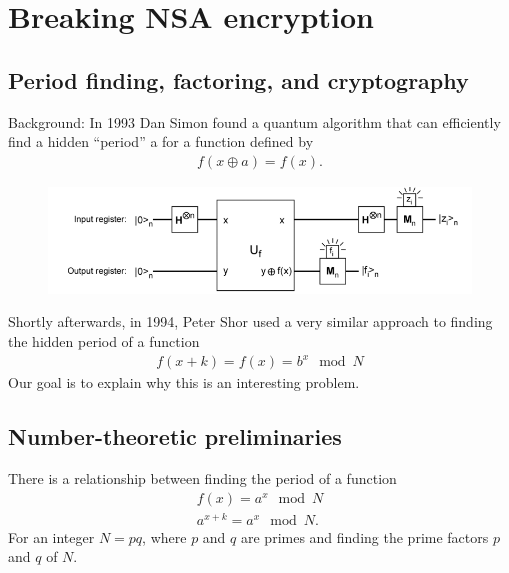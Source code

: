 \documentclass{book}
\theoremstyle{definition}
\begin{document}
\newpage


\section{Breaking NSA encryption}

\subsection{Period finding, factoring, and cryptography}
Background: In 1993 Dan Simon found a quantum
algorithm that can efficiently find a hidden ``period'' a for a
function defined by
\begin{align}
f(x \oplus a) = f(x).
\end{align}
\begin{figure}[!htb]
	\centering
	\includegraphics[scale=0.5]{rsa1}
\end{figure}


Shortly afterwards, in 1994, Peter Shor used a very similar
approach to finding the hidden period of a function 
\begin{align}
f(x+k) = f(x)= b^x \mod N
\end{align}
Our goal is to explain why this is an interesting problem. 
























\subsection{Number-theoretic preliminaries}


There is a relationship between finding the period of a function
\begin{align}
f(x) = a^x \mod N\\
a^{x+k} = a^x \mod N.
\end{align}
For an integer $N = pq$, where $p$ and $q$ are primes and finding the
prime factors $p$ and $q$ of $N$.\\
\end{document}
